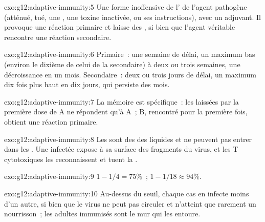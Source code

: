 \begin{solution}{exo:g12:adaptive-immunity:5}
Une forme inoffensive de l' de l'agent pathogène (atténué,
tué, une , une toxine inactivée, ou ses instructions), avec un
adjuvant. Il provoque une réaction primaire et laisse des , si bien que l'agent véritable rencontre une réaction
secondaire.
\end{solution}

\begin{solution}{exo:g12:adaptive-immunity:6}
Primaire~: une semaine de délai, un maximum bas (environ le dixième de
celui de la secondaire) à deux ou trois semaines, une décroissance en
un mois. Secondaire~: deux ou trois jours de délai, un maximum dix
fois plus haut en dix jours, qui persiste des mois.
\end{solution}

\begin{solution}{exo:g12:adaptive-immunity:7}
La mémoire est spécifique~: les  laissées par la
première dose de A ne répondent qu'à A~; B, rencontré pour la première
fois, obtient une réaction primaire.
\end{solution}

\begin{solution}{exo:g12:adaptive-immunity:8}
Les  sont des  des liquides et ne peuvent pas entrer
dans les . Une  infectée expose à sa surface des
fragments du virus, et les  T cytotoxiques les
reconnaissent et tuent la .
\end{solution}

\begin{solution}{exo:g12:adaptive-immunity:9}
$1 - 1/4 = 75\%$~; $1 - 1/18 \approx 94\%$.
\end{solution}

\begin{solution}{exo:g12:adaptive-immunity:10}
Au-dessus du seuil, chaque cas en infecte moins d'un autre, si bien
que le virus ne peut pas circuler et n'atteint que rarement un
nourrisson~; les adultes immunisés sont le mur qui les entoure.
\end{solution}

